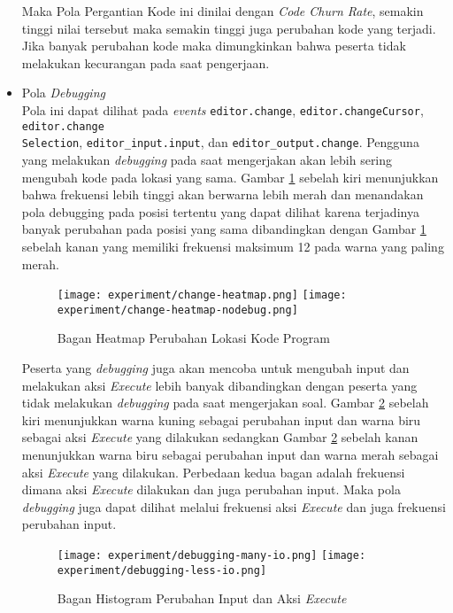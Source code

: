 \begin{itemize}
    Maka Pola Pergantian Kode ini dinilai dengan \textit{Code Churn Rate}, semakin tinggi nilai tersebut maka semakin tinggi juga perubahan kode yang terjadi. Jika banyak perubahan kode maka dimungkinkan bahwa peserta tidak melakukan kecurangan pada saat pengerjaan.

    \item Pola \textit{Debugging} \\
    Pola ini dapat dilihat pada \textit{events} \verb|editor.change|, \verb|editor.changeCursor|, \verb|editor.change|\\\verb|Selection|, \verb|editor_input.input|, dan \verb|editor_output.change|. Pengguna yang melakukan \textit{debugging} pada saat mengerjakan akan lebih sering mengubah kode pada lokasi yang sama. Gambar \ref{fig:5:2:3:heatmapchange} sebelah kiri menunjukkan bahwa frekuensi lebih tinggi akan berwarna lebih merah dan menandakan pola debugging pada posisi tertentu yang dapat dilihat karena terjadinya banyak perubahan pada posisi yang sama dibandingkan dengan Gambar \ref{fig:5:2:3:heatmapchange} sebelah kanan yang memiliki frekuensi maksimum 12 pada warna yang paling merah.

    \begin{figure}[H]
        \centering
        \texttt{[image: experiment/change-heatmap.png]}
        \texttt{[image: experiment/change-heatmap-nodebug.png]}
        \caption{Bagan Heatmap Perubahan Lokasi Kode Program}
        \label{fig:5:2:3:heatmapchange}
    \end{figure}
    
    Peserta yang \textit{debugging} juga akan mencoba untuk mengubah input dan melakukan aksi \textit{Execute} lebih banyak dibandingkan dengan peserta yang tidak melakukan \textit{debugging} pada saat mengerjakan soal. Gambar \ref{fig:5:2:3:debug} sebelah kiri menunjukkan warna kuning sebagai perubahan input dan warna biru sebagai aksi \textit{Execute} yang dilakukan sedangkan Gambar \ref{fig:5:2:3:debug} sebelah kanan menunjukkan warna biru sebagai perubahan input dan warna merah sebagai aksi \textit{Execute} yang dilakukan. Perbedaan kedua bagan adalah frekuensi dimana aksi \textit{Execute} dilakukan dan juga perubahan input. Maka pola \textit{debugging} juga dapat dilihat melalui frekuensi aksi \textit{Execute} dan juga frekuensi perubahan input.

    \begin{figure}[H]
        \centering
        \texttt{[image: experiment/debugging-many-io.png]}
        \texttt{[image: experiment/debugging-less-io.png]}
        \caption{Bagan Histogram Perubahan Input dan Aksi \textit{Execute}}
        \label{fig:5:2:3:debug}
    \end{figure}


\end{itemize}
